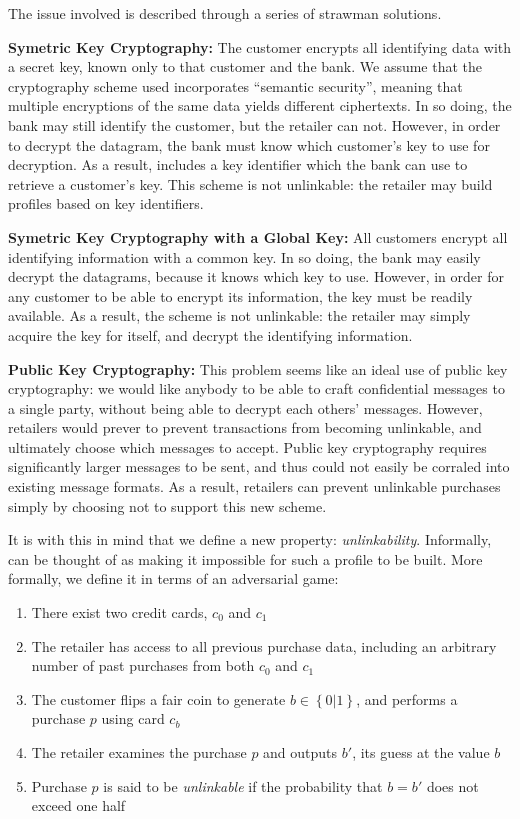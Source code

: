 The issue involved is described through a series of strawman solutions.

\begin{description}
\item{\textbf{Symetric Key Cryptography:}}
The customer encrypts all identifying data with a secret key, known only to that customer and the bank.
We assume that the cryptography scheme used incorporates ``semantic security'', meaning that multiple encryptions of the same data yields
  different ciphertexts.
In so doing, the bank may still identify the customer, but the retailer can not.
However, in order to decrypt the datagram, the bank must know which customer's key to use for decryption.
As a result, includes a key identifier which the bank can use to retrieve a customer's key.
This scheme is not unlinkable: the retailer may build profiles based on key identifiers.
\item{\textbf{Symetric Key Cryptography with a Global Key:}}
All customers encrypt all identifying information with a common key.
In so doing, the bank may easily decrypt the datagrams, because it knows which key to use.
However, in order for any customer to be able to encrypt its information, the key must be readily available.
As a result, the scheme is not unlinkable: the retailer may simply acquire the key for itself, and decrypt the identifying information.
\item{\textbf{Public Key Cryptography:}}
This problem seems like an ideal use of public key cryptography:
we would like anybody to be able to craft confidential messages to a single party, without being able to decrypt each others' messages.
However, retailers would prever to prevent transactions from becoming unlinkable, and ultimately choose which messages to accept.
Public key cryptography requires significantly larger messages to be sent, and thus could not easily be corraled into existing message formats.
As a result, retailers can prevent unlinkable purchases simply by choosing not to support this new scheme.
\end{description}





It is with this in mind that we define a new property: \emph{unlinkability}.
Informally, can be thought of as making it impossible for such a profile to be built.
More formally, we define it in terms of an adversarial game:

\begin{enumerate}
\item There exist two credit cards, $c_0$ and $c_1$
\item The retailer has access to all previous purchase data, including an arbitrary number of past purchases from both $c_0$ and $c_1$
\item The customer flips a fair coin to generate $b \in \left\{0 | 1\right\}$, and performs a purchase $p$ using card $c_b$
\item The retailer examines the purchase $p$ and outputs $b'$, its guess at the value $b$
\item Purchase $p$ is said to be \emph{unlinkable} if the probability that $b = b'$ does not exceed one half
\end{enumerate}